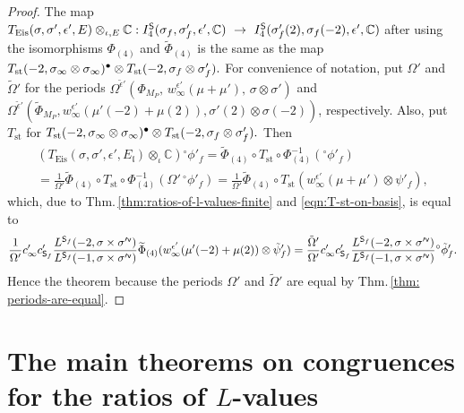 \documentclass[11pt]{amsart}
\newcommand{\sfv}{{\sf v}}
\begin{document}
\begin{proof} 
The map 
$
T_{\textup{Eis}}(\sigma, \sigma', \epsilon', E)\otimes_{\iota, E} \mathbb{C} : 
I_4^\mathsf{S}(\sigma_f, \sigma'_f, \epsilon', \mathbb{C}) \ \to \  I_4^\mathsf{S}(\sigma'_f(2), \sigma_f(-2), \epsilon', \mathbb{C})
$
after using the isomorphisms $\Phi_{(4)}$ and $\widetilde{\Phi}_{(4)}$ is the same as the map 
$T_{\text{st}}(-2, \sigma_\infty\otimes \sigma_\infty)^\bullet \otimes T_{\textup{st}}(-2, \sigma_f \otimes \sigma'_f).$ 
For convenience of notation, put $\Omega'$ and $\tilde{\Omega}'$ for the periods 
$\Omega^{\tilde{\epsilon}'}(\Phi_{M_P}, \, w^{\epsilon'}_{\infty}(\mu + \mu'), \, \sigma \otimes \sigma')$ and 
$\Omega^{\tilde{\epsilon}'}(\widetilde{\Phi}_{M_P}, w^{\epsilon'}_{\infty}(\mu'(-2) + \mu(2)), \sigma'(2) \otimes \sigma(-2))$, respectively. 
Also, put $T_{\text{st}}$ for $T_{\text{st}}(-2, \sigma_\infty\otimes \sigma_\infty)^\bullet \otimes T_{\textup{st}}(-2, \sigma_f \otimes \sigma'_f).$ Then 
\begin{multline*}
		(T_{\text{Eis}}(\sigma, \sigma', \epsilon',E_\mathfrak{l})\otimes_\iota\mathbb{C}) {^\circ}\phi'_f = \widetilde{\Phi}_{(4)} \circ T_{\text{st}} \circ \Phi_{(4)}^{-1}( {^\circ}\phi'_f) \\= \frac{1}{\Omega'} \widetilde{\Phi}_{(4)} \circ T_{\text{st}} \circ \Phi_{(4)}^{-1} (\Omega' \,{^\circ}\phi'_f ) = \frac{1}{\Omega'} \widetilde{\Phi}_{(4)} \circ T_{\text{st}} ( w_\infty^{\epsilon'}(\mu+\mu')\otimes \psi'_f),
\end{multline*}
which, due to Thm.\,\ref{thm:ratios-of-l-values-finite} and \eqref{eqn:T-st-on-basis}, is equal to
\begin{equation*}
	\frac{1}{\Omega'} c'_\infty c'_{\mathsf{S}_f} \frac{L^{\mathsf{S}_f}(-2, \sigma \times \sigma'^\sfv)}{L^{\mathsf{S}_f}(-1, \sigma \times \sigma'^\sfv) } \widetilde{\Phi}_{(4)}(w^{\epsilon'}_{\infty}(\mu'(-2)+ \mu(2)) \otimes \tilde{\psi}'_f) 
	= \frac{\tilde{\Omega}'}{\Omega'} c'_\infty c'_{\mathsf{S}_f} \frac{L^{\mathsf{S}_f}(-2, \sigma \times \sigma'^\sfv)}{L^{\mathsf{S}_f}(-1, \sigma \times \sigma'^\sfv) } {^\circ}\tilde{\phi}'_f.
\end{equation*}
Hence the theorem because the periods $\Omega'$ and $\tilde{\Omega}'$ are equal by Thm.\,\ref{thm: periods-are-equal}. 
\end{proof}

\bigskip
\section{The main theorems on congruences for the ratios of $L$-values}
\end{document}
